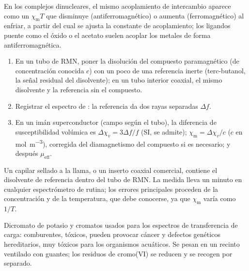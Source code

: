 En los complejos dinucleares, el mismo acoplamiento de intercambio aparece como un $\chi_{\mathrm m}T$ que disminuye
(antiferromagnético) o aumenta (ferromagnético) al enfriar, a partir del cual se ajusta la constante
de acoplamiento; los ligandos puente como el óxido o el acetato suelen acoplar los
metales de forma antiferromagnética.

\begin{method}\label{met:b3:complex-spectra-magnetism:evans}
\begin{enumerate}
  \item En un tubo de RMN, poner la disolución del compuesto paramagnético (de concentración
        conocida $c$) con un poco de una referencia inerte (terc-butanol, la señal residual del
        disolvente); en un tubo interior coaxial, el mismo disolvente y la
        referencia sin el compuesto.
  \item Registrar el espectro de : la referencia da dos rayas separadas $\Delta f$.
  \item En un imán superconductor (campo según el tubo), la diferencia de susceptibilidad
        volúmica es $\Delta\chi_v = 3\Delta f/f$ (SI, se admite); $\chi_{\mathrm m} = \Delta\chi_v/c$ ($c$ en
        \unit{mol.m^{-3}}), corregida del diamagnetismo del compuesto si es necesario;
        y después $\mu_{\mathrm{eff}}$.
\end{enumerate}
\end{method}

\begin{inthelab}
Un capilar sellado a la llama, o un inserto coaxial comercial, contiene el disolvente de
referencia dentro del tubo de RMN. La medida lleva un minuto en cualquier espectrómetro
de rutina; los errores principales proceden de la concentración y de la
temperatura, que debe conocerse, ya que $\chi_{\mathrm m}$ varía como $1/T$.
\end{inthelab}

\begin{safety}{}
Dicromato de potasio y cromatos usados para los espectros de transferencia de carga:
comburentes, tóxicos, pueden provocar cáncer y defectos genéticos hereditarios, muy tóxicos para
los organismos acuáticos. Se pesan en un recinto ventilado con guantes; los residuos de cromo(VI)
se reducen y se recogen por separado.
\end{safety}


